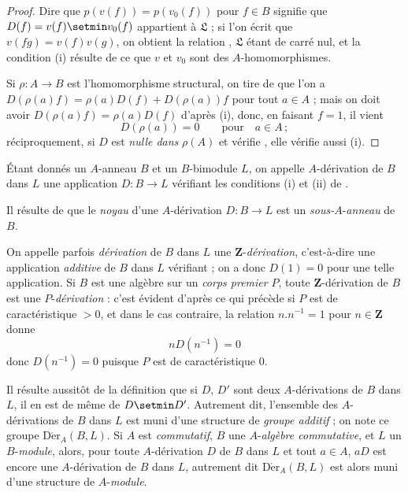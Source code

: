 \begin{proof}
Dire que $p(v(f))=p(v_0(f))$ pour $f\in B$ signifie que
$D(f)=v(f)\setmin v_0(f)$ appartient à $\mathfrak{L}$ ; si l'on écrit que
$v(fg)=v(f)v(g)$, on obtient la relation ,
$\mathfrak{L}$ étant de carré nul, et la condition (i) résulte de ce que $v$
et $v_0$ sont des $A$-homomorphismes.

Si $\rho:A\to B$ est l'homomorphisme structural, on tire de
 que l'on a
$D(\rho(a)f)=\rho(a)D(f)+D(\rho(a))f$ pour tout $a\in A$ ; mais on doit
avoir $D(\rho(a)f)=\rho(a)D(f)$ d'après (i), donc, en faisant $f=1$, il
vient
\[
  D(\rho(a))=0 \qquad\text{pour}\quad a\in A\,;
\]
réciproquement, si $D$ est \emph{nulle dans} $\rho(A)$ et vérifie
, elle vérifie aussi (i).
\end{proof}

\begin{definition}[20.1.2]
\label{0.20.1.2-fr}
Étant donnés un $A$-anneau $B$ et un $B$-bimodule $L$, on appelle
$A$-dérivation de $B$ dans $L$ une application $D:B\to L$ vérifiant
les conditions \textup{(i)} et \textup{(ii)} de \textup{}.
\end{definition}

Il résulte de  que le \emph{noyau} d'une $A$-dérivation
$D:B\to L$ est un \emph{sous-}$A$-\emph{anneau} de $B$.

On appelle parfois \emph{dérivation} de $B$ dans $L$ une
$\mathbf{Z}$-\emph{dérivation}, c'est-à-dire une application \emph{additive} de $B$
dans $L$ vérifiant  ; on a donc $D(1)=0$ pour une telle
application. Si $B$ est une algèbre sur un \emph{corps premier} $P$, toute
$\mathbf{Z}$-dérivation de $B$ est une $P$-\emph{dérivation} : c'est évident d'après
ce qui précède si $P$ est de caractéristique $>0$, et dans le cas contraire,
la relation $n.n^{-1}=1$ pour $n\in\mathbf{Z}$ donne
\[
  nD(n^{-1})=0
\]
donc $D(n^{-1})=0$ puisque $P$ est de caractéristique $0$.

Il résulte aussitôt de la définition  que si $D$, $D'$ sont
deux $A$-dérivations de $B$ dans $L$, il en est de même de $D\setmin D'$. Autrement
dit, l'ensemble des $A$-dérivations de $B$ dans $L$ est muni d'une structure
de \emph{groupe additif} ; on note ce groupe
$\operatorname{D\acute{e}r}_A(B,L)$. Si $A$ est \emph{commutatif}, $B$ une
$A$-\emph{algèbre commutative}, et $L$ un $B$-\emph{module}, alors, pour toute
$A$-dérivation $D$ de $B$ dans $L$ et tout $a\in A$, $aD$ est encore une
$A$-dérivation de $B$ dans $L$, autrement dit $\operatorname{D\acute{e}r}_A(B,L)$
est alors muni d'une structure de $A$-\emph{module}.

